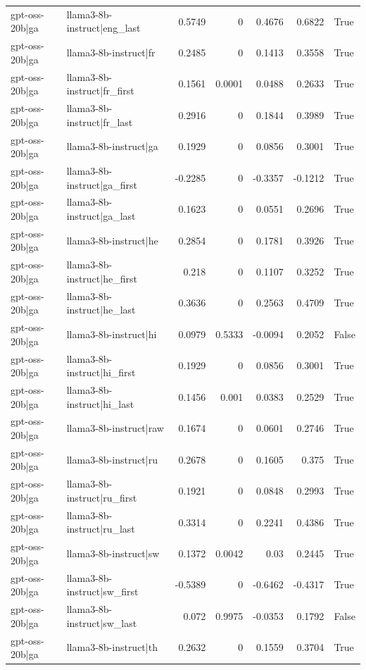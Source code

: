 \begin{table}
\begin{tabular}{l l r r r r l}
gpt-oss-20b|ga & llama3-8b-instruct|eng_last & 0.5749 & 0 & 0.4676 & 0.6822 & True \\
gpt-oss-20b|ga & llama3-8b-instruct|fr & 0.2485 & 0 & 0.1413 & 0.3558 & True \\
gpt-oss-20b|ga & llama3-8b-instruct|fr_first & 0.1561 & 0.0001 & 0.0488 & 0.2633 & True \\
gpt-oss-20b|ga & llama3-8b-instruct|fr_last & 0.2916 & 0 & 0.1844 & 0.3989 & True \\
gpt-oss-20b|ga & llama3-8b-instruct|ga & 0.1929 & 0 & 0.0856 & 0.3001 & True \\
gpt-oss-20b|ga & llama3-8b-instruct|ga_first & -0.2285 & 0 & -0.3357 & -0.1212 & True \\
gpt-oss-20b|ga & llama3-8b-instruct|ga_last & 0.1623 & 0 & 0.0551 & 0.2696 & True \\
gpt-oss-20b|ga & llama3-8b-instruct|he & 0.2854 & 0 & 0.1781 & 0.3926 & True \\
gpt-oss-20b|ga & llama3-8b-instruct|he_first & 0.218 & 0 & 0.1107 & 0.3252 & True \\
gpt-oss-20b|ga & llama3-8b-instruct|he_last & 0.3636 & 0 & 0.2563 & 0.4709 & True \\
gpt-oss-20b|ga & llama3-8b-instruct|hi & 0.0979 & 0.5333 & -0.0094 & 0.2052 & False \\
gpt-oss-20b|ga & llama3-8b-instruct|hi_first & 0.1929 & 0 & 0.0856 & 0.3001 & True \\
gpt-oss-20b|ga & llama3-8b-instruct|hi_last & 0.1456 & 0.001 & 0.0383 & 0.2529 & True \\
gpt-oss-20b|ga & llama3-8b-instruct|raw & 0.1674 & 0 & 0.0601 & 0.2746 & True \\
gpt-oss-20b|ga & llama3-8b-instruct|ru & 0.2678 & 0 & 0.1605 & 0.375 & True \\
gpt-oss-20b|ga & llama3-8b-instruct|ru_first & 0.1921 & 0 & 0.0848 & 0.2993 & True \\
gpt-oss-20b|ga & llama3-8b-instruct|ru_last & 0.3314 & 0 & 0.2241 & 0.4386 & True \\
gpt-oss-20b|ga & llama3-8b-instruct|sw & 0.1372 & 0.0042 & 0.03 & 0.2445 & True \\
gpt-oss-20b|ga & llama3-8b-instruct|sw_first & -0.5389 & 0 & -0.6462 & -0.4317 & True \\
gpt-oss-20b|ga & llama3-8b-instruct|sw_last & 0.072 & 0.9975 & -0.0353 & 0.1792 & False \\
gpt-oss-20b|ga & llama3-8b-instruct|th & 0.2632 & 0 & 0.1559 & 0.3704 & True \\

\end{tabular}
\end{table}
